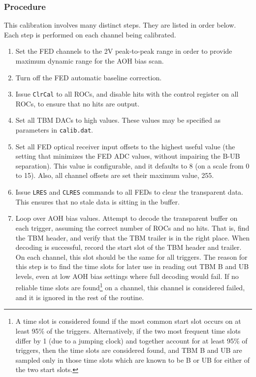 \subsubsection{Procedure}
This calibration involves many distinct steps.  They are listed in order below.  Each step is performed on each channel being calibrated.
\begin{enumerate}
\item Set the FED channels to the 2V peak-to-peak range in order to provide maximum dynamic range for the AOH bias scan.
\item Turn off the FED automatic baseline correction.
\item Issue \verb|ClrCal| to all ROCs, and disable hits with the control register on all ROCs, to ensure that no hits are output.
\item Set all TBM DACs to high values.  These values may be specified as parameters in \verb|calib.dat|.
\item Set all FED optical receiver input offsets to the highest useful value (the setting that minimizes the FED ADC values, without impairing the B-UB separation).  This value is configurable, and it defaults to 8 (on a scale from 0 to 15).  Also, all channel offsets are set their maximum value, 255. \label{item:FEDReceiverOffset}
\item Issue \verb|LRES| and \verb|CLRES| commands to all FEDs to clear the transparent data.  This ensures that no stale data is sitting in the buffer.
\item Loop over AOH bias values.  Attempt to decode the transparent buffer on each trigger, assuming the correct number of ROCs and no hits. That is, find the TBM header, and verify that the TBM trailer is in the right place.  When decoding is successful, record the start slot of the TBM header and trailer.  On each channel, this slot should be the same for all triggers.  The reason for this step is to find the time slots for later use in reading out TBM B and UB levels, even at low AOH bias settings where full decoding would fail. If no reliable time slots are found\footnote{A time slot is considered found if the most common start slot occurs on at least 95\% of the triggers.  Alternatively, if the two most frequent time slots differ by 1 (due to a jumping clock) and together account for at least 95\% of triggers, then the time slots are considered found, and TBM B and UB are sampled only in those time slots which are known to be B or UB for either of the two start slots.} on a channel, this channel is considered failed, and it is ignored in the rest of the routine.

\end{enumerate}
